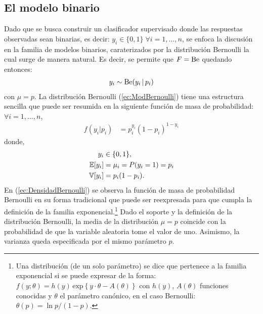 \documentclass[../Main/Main.tex]{subfiles}
\begin{document}
\subsection{El modelo binario}
Dado que se busca construir un clasificador supervisado donde las respuestas observadas sean binarias, es decir: $y_i \in \{0,1\} \; \forall i=1,\ldots,n$, se enfoca la discusión en la familia de modelos binarios, caraterizados por la distribución Bernoulli la cual surge de manera natural. Es decir, se permite que $F = \text{Be}$ quedando entonces:
\begin{align}
	y_i \sim \text{Be}(y_i \, |\, p_i) \label{ec:ModBernoulli}
\end{align}
con $\mu = p$. La distribución Bernoulli (\ref{ec:ModBernoulli}) tiene una estructura sencilla que puede ser resumida en la siguiente función de masa de probabilidad: $\forall i = 1,\ldots,n$,
\begin{align}
	f(y_i|p_i) &= p_i^{y_i}(1 - p_i)^{1 - y_i} \label{ec:DensidadBernoulli} 
\end{align}
donde,
\begin{align*}	
	y_i &\in \{0,1\},  \nonumber\\
	\mathbb{E}[y_i] &= \mu_i = P(y_i = 1) = p_i  \nonumber\\
	\mathbb{V}[y_i] &= p_i(1 - p_i) \nonumber.
\end{align*}			
En (\ref{ec:DensidadBernoulli}) se observa la función de masa de probabilidad Bernoulli en su forma tradicional que puede ser reexpresada para que cumpla la definición de la familia exponencial.\footnote{Una distribución (de un solo parámetro) se dice que pertenece a la familia exponencial si se puede expresar de la forma: $f(y;\theta) = h(y)\,\text{exp}\left\{y\cdot\theta - A(\theta)\right\}$ con $h(y)$, $A(\theta)$ funciones conocidas y $\theta$ el parámetro canónico, en el caso Bernoulli: $\theta(p) = \ln p/(1-p)$.} Dado el soporte y la definición de la distribución Bernoulli, la media de la distribución $\mu = p$ coincide con la probabilidad de que la variable aleatoria tome el valor de uno. Asimismo, la varianza queda especificada por el mismo parámetro $p$. 
\end{document}
